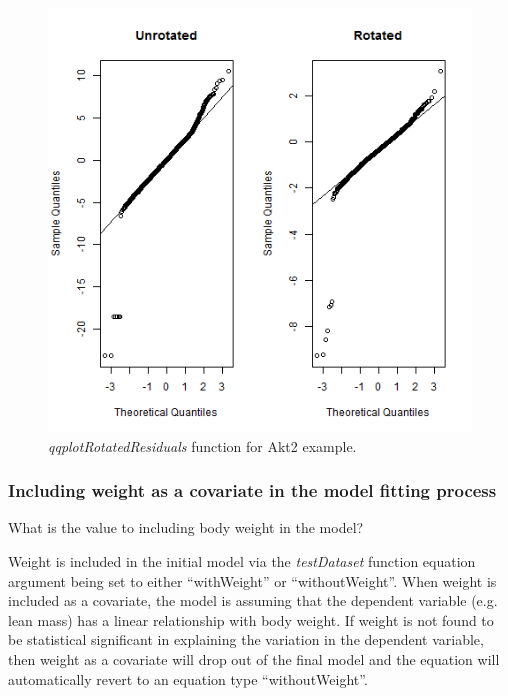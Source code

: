 \documentclass[12pt,a4paper]{article}
\begin{document}
\begin{itemize}
\begin{figure}[H]%
\centerline{\includegraphics[scale=0.5]{cs1_qqplotRotatedResiduals.png}}
\caption{\textit{qqplotRotatedResiduals} function for Akt2 example.}\label{fig:20}
\end{figure}

\end{itemize}



\subsubsection{Including weight as a covariate in the model fitting process}
What is the value to including body weight in the model?

Weight is included in the initial model via the \textit{testDataset} function equation argument being set to either “withWeight” or “withoutWeight”.  
When weight is included as a covariate, the model is assuming that the dependent variable (e.g. lean mass) has a linear relationship with body weight. 
If weight is not found to be statistical significant in explaining the variation in the dependent variable, 
then weight as a covariate will drop out of the final model and the equation will automatically revert to an equation type “withoutWeight”.  
\end{document}

